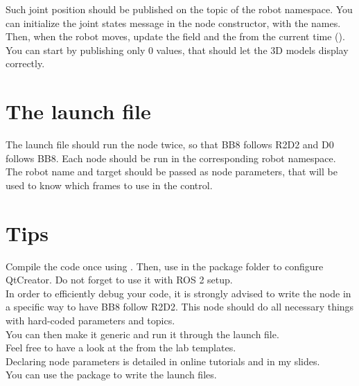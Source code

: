 \documentclass{ecnreport}
\begin{document}
Such joint position should be published on the  topic of the robot namespace. You can initialize the joint states message in the node constructor, with the names.\\

Then, when the robot moves, update the  field and the  from the current time ().\\

You can start by publishing only 0 values, that should let the 3D models display correctly.

\section{The launch file}

The launch file should run the node twice, so that BB8 follows R2D2 and D0 follows BB8. Each node should be run in the corresponding robot namespace. The robot name and target should be passed as node parameters, that will be used to know which frames to use in the control.
\newpage
\section{Tips}

Compile the code once using . Then, use  in the package folder to configure QtCreator. Do not forget to use it with ROS 2 setup.\\

In order to efficiently debug your code, it is strongly advised to write the node in a specific way to have BB8 follow R2D2. This node should do all necessary things with hard-coded parameters and topics.\\
You can then make it generic and run it through the launch file.\\

Feel free to have a look at the  from the lab templates.\\

Declaring node parameters is detailed in online tutorials and in my slides.\\

You can use the  package to write the launch files.\\
\end{document}
